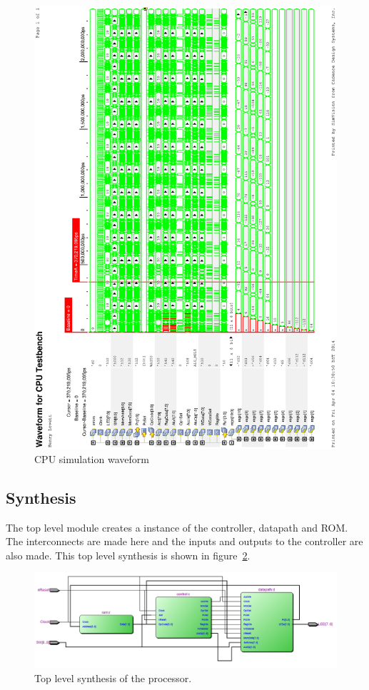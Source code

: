 \begin{figure}
\includegraphics[height=\textheight]{Figures/cpusim.eps}
\caption{CPU simulation waveform}
\label{fig:cpusim}
\end{figure}

\subsection{Synthesis}

The top level module creates a instance of the controller, datapath and ROM. 
The interconnects are made here and the inputs and outputs to the controller are also made.
This top level synthesis is shown in figure~\ref{fig:cpusynth}.


\begin{figure}
\includegraphics[width=\textwidth]{Figures/cpusynth.png}
\caption{Top level synthesis of the processor.}
\label{fig:cpusynth}
\end{figure}

